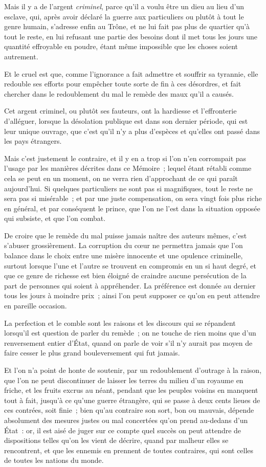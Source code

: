 \documentclass[french,twoside]{book} %
\begin{document}
Mais il y a de l’argent {\itshape criminel}, parce qu’il a voulu être un dieu au lieu d’un esclave, qui, après avoir déclaré la guerre aux particuliers ou plutôt à tout le genre humain, s’adresse enfin au Trône, et ne lui fait pas plus de quartier qu’à tout le reste, en lui refusant une partie des besoins dont il met tous les jours une quantité effroyable en poudre, étant même impossible que les choses soient autrement.\par
Et le cruel est que, comme l’ignorance a fait admettre et souffrir sa tyrannie, elle redouble ses efforts pour empêcher toute sorte de fin à ces désordres, et fait chercher dans le redoublement du mal le remède des maux qu’il a causés.\par
Cet argent criminel, ou plutôt ses fauteurs, ont la hardiesse et l’effronterie d’alléguer, lorsque la désolation publique est dans son dernier période, qui est leur unique ouvrage, que c’est qu’il n’y a plus d’espèces et qu’elles ont passé dans les pays étrangers.\par
Mais c’est justement le contraire, et il y en a trop si l’on n’en corrompait pas l’usage par les manières décrites dans ce Mémoire ; lequel étant rétabli comme cela se peut en un moment, on ne verra rien d’approchant de ce qui paraît aujourd’hui. Si quelques particuliers ne sont pas si magnifiques, tout le reste ne sera pas si misérable ; et par une juste compensation, on sera vingt fois plus riche en général, et par conséquent le prince, que l’on ne l’est dans la situation opposée qui subsiste, et que l’on combat.\par
De croire que le remède du mal puisse jamais naître des auteurs mêmes, c’est s’abuser grossièrement. La corruption du cœur ne permettra jamais que l’on balance dans le choix entre une misère innocente et une opulence criminelle, surtout lorsque l’une et l’autre se trouvent en compromis en un si haut degré, et que ce genre de richesse est bien éloigné de craindre aucune persécution de la part de personnes qui soient à appréhender. La préférence est donnée au dernier tous les jours à moindre prix ; ainsi l’on peut supposer ce qu’on en peut attendre en pareille occasion.\par
La perfection et le comble sont les raisons et les discours qui se répandent lorsqu’il est question de parler du remède ; on ne touche de rien moins que d’un renversement entier d’État, quand on parle de voir s’il n’y aurait pas moyen de faire cesser le plus grand bouleversement qui fut jamais.\par
Et l’on n’a point de honte de soutenir, par un redoublement d’outrage à la raison, que l’on ne peut discontinuer de laisser les terres du milieu d’un royaume en friche, et les fruits excrus au néant, pendant que les peuples voisins en manquent tout à fait, jusqu’à ce qu’une guerre étrangère, qui se passe à deux cents lieues de ces contrées, soit finie ; bien qu’au contraire son sort, bon ou mauvais, dépende absolument des mesures justes ou mal concertées qu’on prend au-dedans d’un État : or, il est aisé de juger sur ce compte quel succès on peut attendre de dispositions telles qu’on les vient de décrire, quand par malheur elles se rencontrent, et que les ennemis en prennent de toutes contraires, qui sont celles de toutes les nations du monde.\par
\end{document}
